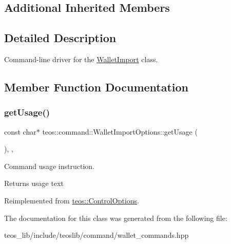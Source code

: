 \subsection*{Additional Inherited Members}


\subsection{Detailed Description}
Command-\/line driver for the \mbox{\hyperlink{classteos_1_1command_1_1_wallet_import}{Wallet\+Import}} class. 

\subsection{Member Function Documentation}
\mbox{\label{classteos_1_1command_1_1_wallet_import_options_ad641b37bd61f2d4ff3e3049e2dd6be0e}} 
\subsubsection{\texorpdfstring{get\+Usage()}{getUsage()}}
{\footnotesize\ttfamily const char$\ast$ teos\+::command\+::\+Wallet\+Import\+Options\+::get\+Usage (\begin{DoxyParamCaption}{ }\end{DoxyParamCaption})\hspace{0.3cm}{\ttfamily [inline]}, {\ttfamily [protected]}, {\ttfamily [virtual]}}



Command \textquotesingle{}usage\textquotesingle{} instruction. 

\begin{DoxyReturn}{Returns}
usage text 
\end{DoxyReturn}


Reimplemented from \mbox{\hyperlink{classteos_1_1_control_options_a0aa5671f9bc750ed5280c26c543874f3}{teos\+::\+Control\+Options}}.



The documentation for this class was generated from the following file\+:\begin{DoxyCompactItemize}
\item 
teos\+\_\+lib/include/teoslib/command/wallet\+\_\+commands.\+hpp\end{DoxyCompactItemize}
